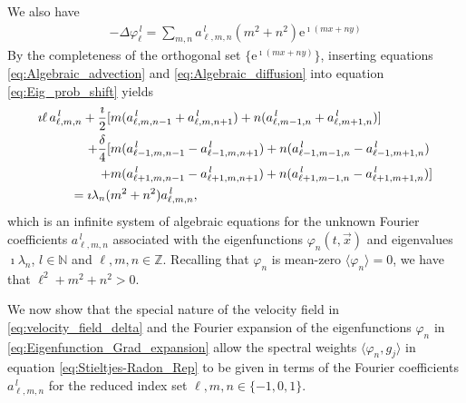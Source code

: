 \documentclass[11pt]{amsart}
\newcommand{\e}{\mathrm{e}}
\begin{document}
%
We also have 
%
\begin{align}\label{eq:Algebraic_diffusion}
  -\Delta\varphi_\ell^{\,l}=\sum_{m,n}a^{\,l}_{\ell,m,n}(m^2+n^2)\e^{\imath (mx+ny)}
\end{align}
%
By the completeness of the orthogonal set $\{\e^{\imath (mx+ny)}\}$, 
inserting equations \eqref{eq:Algebraic_advection} and
\eqref{eq:Algebraic_diffusion} into equation
\eqref{eq:Eig_prob_shift} yields
%
\begin{align}\label{eq:Fourier_Coef_System}
\imath \ell\,a^{\,l}_{\ell,m,n}+\frac{\imath}{2}
[&m(a^{\,l}_{\ell,m,n-1}+a^{\,l}_{\ell,m,n+1})+n(a^{\,l}_{\ell,m-1,n}+a^{\,l}_{\ell,m+1,n})]
\notag\\
+\frac{\delta}{4}[&m(a^{\,l}_{\ell-1,m,n-1}-a^{\,l}_{\ell-1,m,n+1})+n(a^{\,l}_{\ell-1,m-1,n}-a^{\,l}_{\ell-1,m+1,n})
\notag\\
+&m(a^{\,l}_{\ell+1,m,n-1}-a^{\,l}_{\ell+1,m,n+1})+n(a^{\,l}_{\ell+1,m-1,n}-a^{\,l}_{\ell+1,m+1,n})]
\notag\\
=\imath\lambda_n(&m^2+n^2)a^{\,l}_{\ell,m,n},
\end{align}
%
which is an infinite system of algebraic equations for the unknown
Fourier coefficients $a^{\,l}_{\ell,m,n}$ associated with the
eigenfunctions $\varphi_n(t,\vec{x})$ and eigenvalues $\imath\lambda_n$,
$l\in\mathbb{N}$ and $\ell,m,n\in\mathbb{Z}$. Recalling that $\varphi_n$ is
mean-zero $\langle\varphi_n\rangle=0$, we have that $\ell^2+m^2+n^2>0$.








We now show that the special nature of the velocity field in
\eqref{eq:velocity_field_delta} and the Fourier expansion of the eigenfunctions $\varphi_n$ in  
\eqref{eq:Eigenfunction_Grad_expansion} allow the spectral weights
$\langle\varphi_n,g_j\rangle$ in equation \eqref{eq:Stieltjes-Radon_Rep} to be given in
terms of the Fourier coefficients $a^{\,l}_{\ell,m,n}$ for the reduced
index set $\ell,m,n\in\{-1,0,1\}$. 
\end{document}
